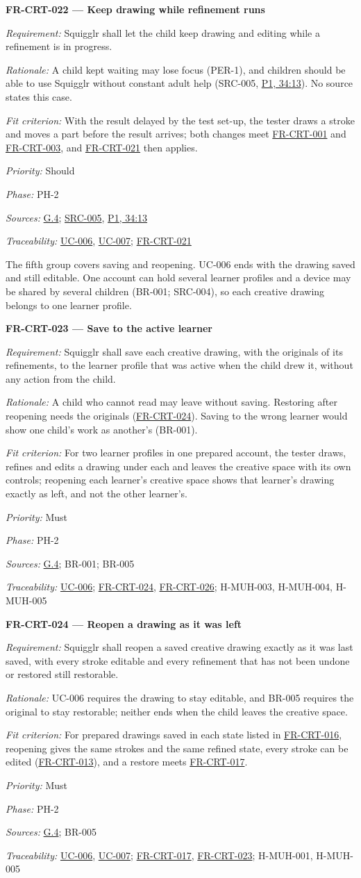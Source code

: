 \documentclass[12pt]{article}
\renewcommand{\_}{\textunderscore\allowbreak}%
\newcommand{\intlink}[3]{\hyperref[int:#1-#2]{#3}}
\newcommand{\intref}[2]{\intlink{#1}{#2}{#1, #2}}
\newcommand{\goalref}[1]{\hyperref[goal:#1]{G.#1}}
\newcommand{\ucref}[1]{\hyperref[uc:#1]{\mbox{UC-#1}}}
\newenvironment{srsrequirement}[2]{%
  \par\medskip\noindent\phantomsection\label{req:#1}%
  \textbf{#1 --- #2}\par\nobreak\smallskip }{\par\medskip}
\newcommand{\reqfield}[2]{\noindent\textit{#1:} #2\par}
\newcommand{\reqshall}[1]{\reqfield{Requirement}{#1}}
\newcommand{\reqrationale}[1]{\reqfield{Rationale}{#1}}
\newcommand{\reqfit}[1]{\reqfield{Fit criterion}{#1}}
\newcommand{\reqpriority}[1]{\reqfield{Priority}{#1}}
\newcommand{\reqphase}[1]{\reqfield{Phase}{#1}}
\newcommand{\reqsources}[1]{\reqfield{Sources}{#1}}
\newcommand{\reqtraces}[1]{\reqfield{Traceability}{#1}}
\newcommand{\reqref}[1]{\hyperref[req:#1]{#1}}
\newcommand{\srcref}[1]{\hyperref[src:#1]{SRC-#1}}
\providecommand{\ucref}[1]{\hyperref[uc:#1]{UC-#1}}
\begin{document}
\begin{srsrequirement}{FR-CRT-022}{Keep drawing while refinement runs}
  \reqshall{Squigglr shall let the child keep drawing and editing while a
refinement is in progress.} \reqrationale{A child kept waiting may lose focus
(PER-1), and children should be able to use Squigglr without constant adult help
(SRC-005, \intref{P1}{34:13}). No source states this case.} \reqfit{With the
result delayed by the test set-up, the tester draws a stroke and moves a part
before the result arrives; both changes meet \reqref{FR-CRT-001} and
\reqref{FR-CRT-003}, and \reqref{FR-CRT-021} then applies.}
  \reqpriority{Should}
  \reqphase{PH-2}
  \reqsources{\goalref{4}; \srcref{005}, \intref{P1}{34:13}}
  \reqtraces{\ucref{006}, \ucref{007}; \reqref{FR-CRT-021}}
\end{srsrequirement}

The fifth group covers saving and reopening. UC-006 ends with the drawing saved
and still editable. One account can hold several learner profiles and a device
may be shared by several children (BR-001; SRC-004), so each creative drawing
belongs to one learner profile.

\begin{srsrequirement}{FR-CRT-023}{Save to the active learner}
  \reqshall{Squigglr shall save each creative drawing, with the originals of its
refinements, to the learner profile that was active when the child drew it,
without any action from the child.} \reqrationale{A child who cannot read may
leave without saving. Restoring after reopening needs the originals
(\reqref{FR-CRT-024}). Saving to the wrong learner would show one child's work
as another's (BR-001).} \reqfit{For two learner profiles in one prepared
account, the tester draws, refines and edits a drawing under each and leaves the
creative space with its own controls; reopening each learner's creative space
shows that learner's drawing exactly as left, and not the other learner's.}
  \reqpriority{Must}
  \reqphase{PH-2}
  \reqsources{\goalref{4}; BR-001; BR-005} \reqtraces{\ucref{006};
  \reqref{FR-CRT-024}, \reqref{FR-CRT-026}; H-MUH-003, H-MUH-004, H-MUH-005}
\end{srsrequirement}

\begin{srsrequirement}{FR-CRT-024}{Reopen a drawing as it was left}
  \reqshall{Squigglr shall reopen a saved creative drawing exactly as it was
last saved, with every stroke editable and every refinement that has not been
undone or restored still restorable.} \reqrationale{UC-006 requires the drawing
to stay editable, and BR-005 requires the original to stay restorable; neither
ends when the child leaves the creative space.} \reqfit{For prepared drawings
saved in each state listed in \reqref{FR-CRT-016}, reopening gives the same
strokes and the same refined state, every stroke can be edited
(\reqref{FR-CRT-013}), and a restore meets \reqref{FR-CRT-017}.}
  \reqpriority{Must}
  \reqphase{PH-2}
  \reqsources{\goalref{4}; BR-005} \reqtraces{\ucref{006}, \ucref{007};
  \reqref{FR-CRT-017}, \reqref{FR-CRT-023}; H-MUH-001, H-MUH-005}
\end{srsrequirement}
\end{document}
